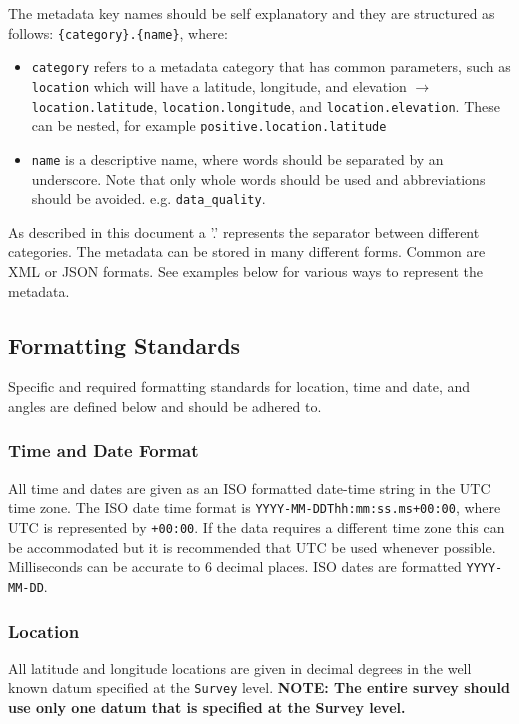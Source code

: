 \documentclass{article}
\begin{document}
The metadata key names should be self explanatory and they are structured as follows: \verb|{category}.{name}|, where:
\begin{itemize}
	\item \verb|category| refers to a metadata category that has common parameters, such as \verb|location| which will have a latitude, longitude, and elevation $\longrightarrow$ \verb|location.latitude|, \verb|location.longitude|, and \verb|location.elevation|.  These can be nested, for example \verb|positive.location.latitude|
	\item \verb|name| is a descriptive name, where words should be separated by an underscore. Note that only whole words should be used and abbreviations should be avoided. e.g. \verb|data_quality|.  
\end{itemize}  

As described in this document a '.' represents the separator between different categories.  The metadata can be stored in many different forms.  Common are XML or JSON formats.  See examples below for various ways to represent the metadata.      

\subsection{Formatting Standards}

Specific and required formatting standards for location, time and date, and angles are defined below and should be adhered to.

\subsubsection{Time and Date Format}

All time and dates are given as an ISO formatted date-time string in the UTC time zone.  The ISO date time format is \verb|YYYY-MM-DDThh:mm:ss.ms+00:00|, where UTC is represented by \verb|+00:00|. If the data requires a different time zone this can be accommodated but it is recommended that UTC be used whenever possible. Milliseconds can be accurate to 6 decimal places.  ISO dates are formatted \verb|YYYY-MM-DD|. 

\subsubsection{Location}

All latitude and longitude locations are given in decimal degrees in the well known datum specified at the \verb|Survey| level. \textbf{NOTE: The entire survey should use only one datum that is specified at the Survey level.}
\end{document}
